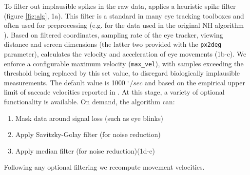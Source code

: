  To filter out implausible spikes in the raw data, \remodnav applies a heuristic spike filter \citep{stampe1993} (figure \ref{fig:alg}, 1a). This filter is a standard in many eye tracking toolboxes and often used for preprocessing (e.g. for the data used in the original NH algorithm \citep{Friedman2018}). Based on filtered coordinates, sampling rate of the eye tracker, viewing distance and screen dimensions (the latter two provided with the \texttt{px2deg} parameter), \remodnav calculates the velocity and acceleration of eye movements (1b-c). We enforce a configurable maximum velocity (\texttt{max\_vel}), with samples exceeding the threshold being replaced by this set value, to disregard biologically implausible measurements. The default value is 1000 $^\circ/sec$ and based on the empirical upper limit of saccade velocities reported in \cite{holmqvist2011eye}.
 At this stage, a variety of optional functionality is available. On demand, the algorithm can: 
 \begin{enumerate}
	\item Mask data around signal loss (such as eye blinks)
	\item Apply Savitzky-Golay filter (for noise reduction)
	\item Apply median filter (for noise reduction)(1d-e)
 \end{enumerate}
 Following any optional filtering we recompute movement velocities. \\

